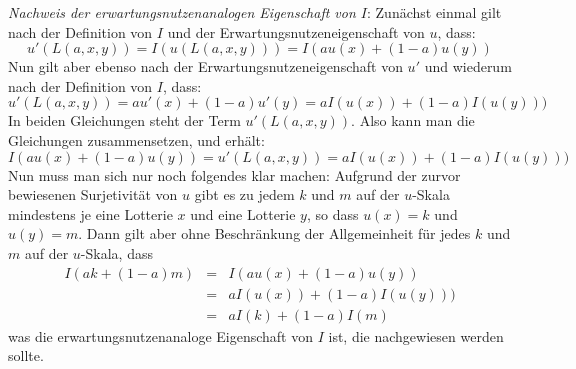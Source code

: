 {\em Nachweis der erwartungsnutzenanalogen Eigenschaft von $I$}:
 Zunächst
einmal gilt nach der Definition von $I$ und der Erwartungsnutzeneigenschaft von
$u$, dass:
\[u'(L(a,x,y)) = I(u(L(a,x,y))) = I(au(x) + (1-a)u(y)) \]
Nun gilt aber ebenso nach der Erwartungsnutzeneigenschaft von $u'$ und wiederum
nach der Definition von $I$, dass:
\[u'(L(a,x,y)) = au'(x) + (1-a)u'(y) = aI(u(x)) + (1-a)I(u(y))) \]
In beiden Gleichungen steht der Term $u'(L(a,x,y))$. Also kann man die
Gleichungen zusammensetzen, und erhält:
\[I(au(x) + (1-a)u(y)) = u'(L(a,x,y)) = aI(u(x)) + (1-a)I(u(y))) \]
Nun muss man sich nur noch folgendes klar machen: Aufgrund der zurvor
bewiesenen Surjetivität von $u$ gibt es zu jedem $k$ und $m$ auf der 
$u$-Skala mindestens je eine Lotterie $x$ und eine Lotterie $y$, so dass $u(x)
= k$ und $u(y) = m$. Dann gilt aber ohne Beschränkung der Allgemeinheit für
jedes $k$ und $m$ auf der $u$-Skala, dass
\begin{eqnarray*}
I(ak + (1-a)m) & =  & I(au(x) + (1-a)u(y))  \\ 
{ } & = & aI(u(x)) + (1-a)I(u(y))) \\
{ } & = & aI(k) + (1-a)I(m)
\end{eqnarray*}
was die erwartungsnutzenanaloge Eigenschaft von $I$ ist, die nachgewiesen werden
sollte.



